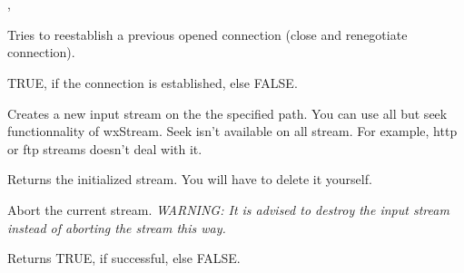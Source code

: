 \section{}\label{wxprotocol}




, 



\label{wxprotoreconnect}


Tries to reestablish a previous opened connection (close and renegotiate connection).


TRUE, if the connection is established, else FALSE.


\label{wxprotogetinput}


Creates a new input stream on the the specified path. You can use all but seek
functionnality of wxStream. Seek isn't available on all stream. For example,
http or ftp streams doesn't deal with it.


Returns the initialized stream. You will have to delete it yourself.


\label{wxprotoabort}


Abort the current stream.
\it{WARNING: It is advised to destroy the input stream instead of aborting the stream this way.}


Returns TRUE, if successful, else FALSE.


